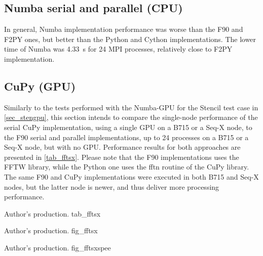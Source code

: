 %
%
%
\subsection{Numba serial and parallel (CPU)}
\label{sec_fftnumb}

In general, Numba implementation performance was worse than the F90 and F2PY ones, but better than the Python and Cython implementations. The lower time of Numba was 4.33~s for 24 MPI processes, relatively close to F2PY implementation. 

%
%
%
\subsection{CuPy (GPU)}
\label{sec_fftngpu}

Similarly to the tests performed with the Numba-GPU for the Stencil test case in \autoref {sec_stengpu}, this section intends to compare the single-node performance of the serial CuPy implementation, using a single GPU on a B715 or a Seq-X node, to the F90 serial and parallel implementations, up to 24 processes on a B715 or a Seq-X node, but with no GPU. Performance results for both approaches are presented in \autoref {tab_fftsx}. Please note that the F90 implementations uses the FFTW library, while the Python one uses the fftn routine of the CuPy library. The same F90 and CuPy implementations were executed in both B715 and Seq-X nodes, but the latter node is newer, and thus deliver more processing performance.

     {Author's production.} {tab_fftsx}

     {Author's production.} {fig_fftsx}

     {Author's production.} {fig_fftsxspee}


